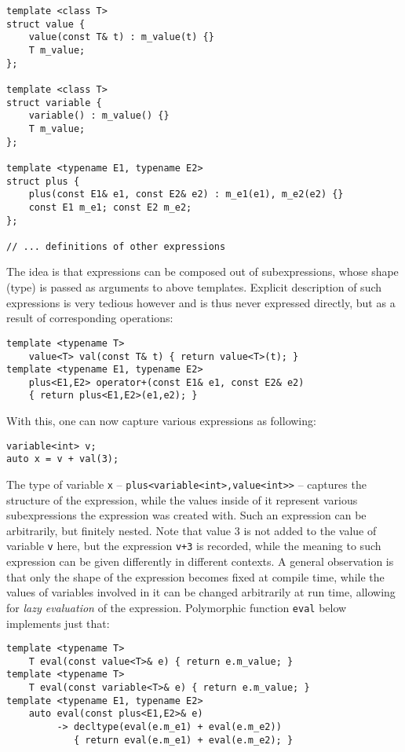 \documentclass[preprint]{sigplanconf}
\makeatletter
\DeclareRobustCommand{\code}[1]{{\lstinline[breaklines=false,escapechar=@]{#1}}}
\makeatother
\begin{document}
\begin{lstlisting}
template <class T>
struct value {
    value(const T& t) : m_value(t) {}
    T m_value;
};

template <class T>
struct variable {
    variable() : m_value() {}
    T m_value;
};

template <typename E1, typename E2>
struct plus {
    plus(const E1& e1, const E2& e2) : m_e1(e1), m_e2(e2) {}
    const E1 m_e1; const E2 m_e2;
};

// ... definitions of other expressions
\end{lstlisting}

\noindent The idea is that expressions can be composed out of subexpressions, 
whose shape (type) is passed as arguments to above templates. Explicit 
description of such expressions is very tedious however and is thus never 
expressed directly, but as a result of corresponding operations: 

\begin{lstlisting}[keepspaces,columns=flexible]
template <typename T>
    value<T> val(const T& t) { return value<T>(t); }
template <typename E1, typename E2>
    plus<E1,E2> operator+(const E1& e1, const E2& e2)
    { return plus<E1,E2>(e1,e2); }
\end{lstlisting}

\noindent With this, one can now capture various expressions as following:

\begin{lstlisting}
variable<int> v;
auto x = v + val(3);
\end{lstlisting}

\noindent The type of variable \code{x} -- \code{plus<variable<int>,value<int>>}
 -- captures the structure of the expression, while the values inside of it 
represent various subexpressions the expression was created with. Such an 
expression can be arbitrarily, but finitely nested. Note that value 3 is not 
added to the value of variable \code{v} here, but the expression \code{v+3} is 
recorded, while the meaning to such expression can be given differently in 
different contexts. A general observation is that only the shape of the 
expression becomes fixed at compile time, while the values of variables involved 
in it can be changed arbitrarily at run time, allowing for \emph{lazy 
evaluation} of the expression. Polymorphic function \code{eval} below implements 
just that:

\begin{lstlisting}[keepspaces,columns=flexible]
template <typename T> 
    T eval(const value<T>& e) { return e.m_value; }
template <typename T> 
    T eval(const variable<T>& e) { return e.m_value; }
template <typename E1, typename E2> 
    auto eval(const plus<E1,E2>& e) 
         -> decltype(eval(e.m_e1) + eval(e.m_e2))
            { return eval(e.m_e1) + eval(e.m_e2); }
\end{lstlisting}
\end{document}
